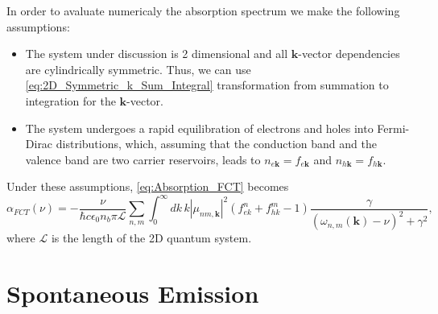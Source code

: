 In order to avaluate numericaly the absorption spectrum we make the
following assumptions:
\begin{itemize}
\item The system under discussion is 2 dimensional and all $\mathbf{k}$-vector
dependencies are cylindrically symmetric. Thus, we can use \ref{eq:2D_Symmetric_k_Sum_Integral}
transformation from summation to integration for the $\mathbf{k}$-vector.
\item The system undergoes a rapid equilibration of electrons and holes
into Fermi-Dirac distributions, which, assuming that the conduction
band and the valence band are two carrier reservoirs, leads to $n_{e\mathbf{k}}=f_{e\mathbf{k}}$
and $n_{h\mathbf{k}}=f_{h\mathbf{k}}$.
\end{itemize}
Under these assumptions, \ref{eq:Absorption_FCT} becomes \begin{equation}
\alpha_{FCT}(\nu)=-\frac{\nu}{\hbar c\epsilon_{0}n_{b}\pi\mathcal{L}}\sum_{n,m}\int_{0}^{\infty}dk\, k\left|\mu_{nm,\mathbf{k}}\right|^{2}\left(f_{ek}^{n}+f_{hk}^{m}-1\right)\frac{\gamma}{\left(\omega_{n,m}(\mathbf{k})-\nu\right)^{2}+\gamma^{2}},\end{equation}
where $\mathcal{L}$ is the length of the 2D quantum system.


\section{Spontaneous Emission}

